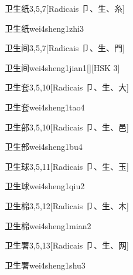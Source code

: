 \begin{entry}{卫生纸}{3,5,7}[Radicais ⼙、⽣、⽷]
  \begin{phonetics}{卫生纸}{wei4sheng1zhi3}
  \end{phonetics}
\end{entry}

\begin{entry}{卫生间}{3,5,7}[Radicais ⼙、⽣、⾨]
  \begin{phonetics}{卫生间}{wei4sheng1jian1}[][HSK 3]
  \end{phonetics}
\end{entry}

\begin{entry}{卫生套}{3,5,10}[Radicais ⼙、⽣、⼤]
  \begin{phonetics}{卫生套}{wei4sheng1tao4}
  \end{phonetics}
\end{entry}

\begin{entry}{卫生部}{3,5,10}[Radicais ⼙、⽣、⾢]
  \begin{phonetics}{卫生部}{wei4sheng1bu4}
  \end{phonetics}
\end{entry}

\begin{entry}{卫生球}{3,5,11}[Radicais ⼙、⽣、⽟]
  \begin{phonetics}{卫生球}{wei4sheng1qiu2}
  \end{phonetics}
\end{entry}

\begin{entry}{卫生棉}{3,5,12}[Radicais ⼙、⽣、⽊]
  \begin{phonetics}{卫生棉}{wei4sheng1mian2}
  \end{phonetics}
\end{entry}

\begin{entry}{卫生署}{3,5,13}[Radicais ⼙、⽣、⽹]
  \begin{phonetics}{卫生署}{wei4sheng1shu3}
  \end{phonetics}
\end{entry}

